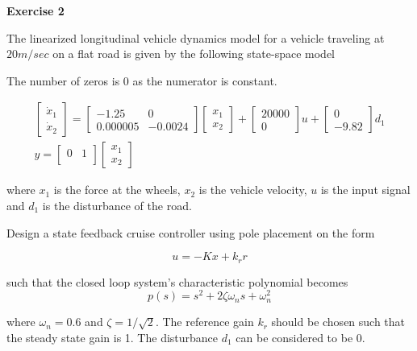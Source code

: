 \textbf{Exercise 2}

The linearized longitudinal vehicle dynamics model for a vehicle traveling at $20 m/sec$ on a flat road is given by the following state-space model

The number of zeros is 0 as the numerator is constant.

\begin{eqnarray}
\begin{bmatrix}
 \dot{x}_1\\
 \dot{x}_2
\end{bmatrix}= 
\begin{bmatrix}
 -1.25 & 0 \\
 0.000005 & -0.0024 
\end{bmatrix}
\begin{bmatrix}
 x_1\\
 x_2
\end{bmatrix} +  
\begin{bmatrix}
 20000\\
 0
\end{bmatrix}u +
\begin{bmatrix}
 0\\
 -9.82
\end{bmatrix}d_1 \\
y=
\begin{bmatrix}
 0 & 1  \\
\end{bmatrix}
\begin{bmatrix}
 x_1\\
 x_2
\end{bmatrix} 
\end{eqnarray}

where $x_1$ is the force at the wheels, $x_2$ is the vehicle velocity, $u$ is the input signal and $d_1$ is the disturbance of the road.

Design a state feedback cruise controller using pole placement on the form

\begin{equation}
u = - K x + k_r r
\end{equation}

such that the closed loop system's characteristic polynomial becomes 
\begin{equation}
p(s) = s^2 + 2\zeta \omega_n s +\omega_{n}^{2}  
\end{equation}

where $\omega_n=0.6$ and $\zeta = 1/\sqrt{2}$. The reference gain $k_r$ should be chosen such that the steady state gain is 1. The disturbance $d_1$ can be considered to be 0.


